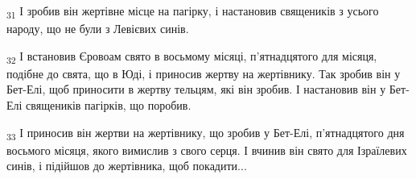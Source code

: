 \begin{tcolorbox}
\textsubscript{31} І зробив він жертівне місце на пагірку, і настановив священиків з усього народу, що не були з Левієвих синів.
\end{tcolorbox}
\begin{tcolorbox}
\textsubscript{32} І встановив Єровоам свято в восьмому місяці, п'ятнадцятого для місяця, подібне до свята, що в Юді, і приносив жертву на жертівнику. Так зробив він у Бет-Елі, щоб приносити в жертву тельцям, які він зробив. І настановив він у Бет-Елі священиків пагірків, що поробив.
\end{tcolorbox}
\begin{tcolorbox}
\textsubscript{33} І приносив він жертви на жертівнику, що зробив у Бет-Елі, п'ятнадцятого дня восьмого місяця, якого вимислив з свого серця. І вчинив він свято для Ізраїлевих синів, і підійшов до жертівника, щоб покадити...
\end{tcolorbox}
